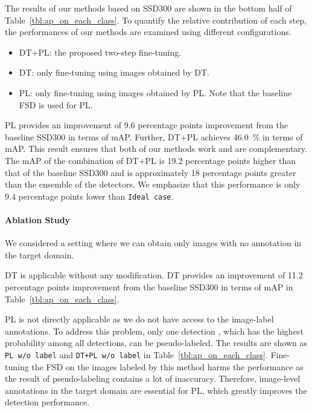 \documentclass[10pt,twocolumn,letterpaper]{article}
\newcommand{\Tref}[1]{Table~\ref{#1}}
\begin{document}
The results of our methods based on SSD300 are shown in the bottom half of \Tref{tbl:ap_on_each_class}.
To quantify the relative contribution of each step, the performances of our methods are examined using different configurations.
\begin{itemize}[wide=0pt]
\setlength{\itemsep}{0cm}
	\item DT+PL: the proposed two-step fine-tuning.
	\item DT: only fine-tuning using images obtained by DT.
	\item PL: only fine-tuning using images obtained by PL. Note that the baseline FSD is used for PL.
\end{itemize}
PL provides an improvement of 9.6 percentage points improvement from the baseline SSD300 in terms of mAP.
Further, DT+PL achieves 46.0~\% in terms of mAP.
This result ensures that both of our methods work and are complementary.
The mAP of the combination of DT+PL is 19.2 percentage points higher than that of the baseline SSD300 and is approximately 18 percentage points greater than the ensemble of the detectors.
We emphasize that this performance is only 9.4 percentage points lower than \texttt{Ideal case}.

\paragraph{Ablation Study}
We considered a setting where we can obtain only images with no annotation in the target domain.

DT is applicable without any modification.
DT provides an improvement of 11.2 percentage points improvement from the baseline SSD300 in terms of mAP in \Tref{tbl:ap_on_each_class}.

PL is not directly applicable as we do not have access to the image-label annotations.
To address this problem, only one detection , which has the highest probability  among all detections, can be pseudo-labeled.
The results are shown as \texttt{PL w/o label} and \texttt{DT+PL w/o label} in \Tref{tbl:ap_on_each_class}.
Fine-tuning the FSD on the images labeled by this method harms the performance as the result of pseudo-labeling contains a lot of inaccuracy.
Therefore, image-level annotations in the target domain are essential for PL, which greatly improves the detection performance.
\end{document}
